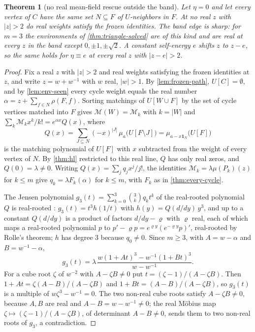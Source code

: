 \documentclass[11pt]{amsart}
\theoremstyle{plain}
\newtheorem{theorem}{Theorem}[section]
\theoremstyle{definition}
\theoremstyle{remark}
\numberwithin{equation}{section}
\newcommand{\Mpot}{\mathcal{M}}           %
\newcommand{\one}{\mathbf{1}}
\begin{document}
\begin{theorem}[no real mean-field rescue outside the band]\label{thm:meanfield}
Let $\eta=0$ and let every vertex of $C$ have the same set $N\subseteq F$ of $U$-neighbors in $F$. At no real $z$ with $|z|>2$ do real weights satisfy the frozen identities. The band edge is sharp: for $m=3$ the environments of \cref{thm:triangle-solved} are of this kind and are real at every $z$ in the band except $0,\pm1,\pm\sqrt2$. A constant self-energy $e$ shifts $z$ to $z-e$, so the same holds for $\eta\equiv e$ at every real $z$ with $|z-e|>2$.
\end{theorem}
\begin{proof}
Fix a real $z$ with $|z|>2$ and real weights satisfying the frozen identities at $z$, and write $z=w+w^{-1}$ with $w$ real, $|w|>1$. By \cref{lem:frozen-path}, $U[C]=\emptyset$, and by \cref{lem:env-seen} every cycle weight equals the real number $\alpha=z+\sum_{f\in N}\rho(F,f)$. Sorting matchings of $U[W\cup F]$ by the set of cycle vertices matched into $F$ gives $\Mpot(W)=\Mpot_k$ with $k=|W|$ and $\sum_k\Mpot_kx^{k}/k!=e^{\alpha x}Q(x)$, where
\[
Q(x)=\sum_{J\subseteq N}(-x)^{|J|}\,\mu_a\bigl(U[F\setminus J]\bigr)=\mu_{a-x\one_N}\bigl(U[F]\bigr)
\]
is the matching polynomial of $U[F]$ with $x$ subtracted from the weight of every vertex of $N$. By \cref{thm:hl} restricted to this real line, $Q$ has only real zeros, and $Q(0)=\lambda\neq0$. Writing $Q(x)=\sum_jq_jx^{j}/j!$, the identities $\Mpot_k=\lambda\mu(P_k)(z)$ for $k\le m$ give $q_k=\lambda F_k(\alpha)$ for $k\le m$, with $F_k$ as in \cref{thm:every-cycle}.

The Jensen polynomial $g_3(t)=\sum_{k=0}^{3}\binom3kq_kt^{k}$ of the real-rooted polynomial $Q$ is real-rooted \cite{PolyaSchur}: $g_3(t)=t^{3}h(1/t)$ with $h(y)=Q(d/dy)\,y^{3}$, and up to a constant $Q(d/dy)$ is a product of factors $d/dy-\varrho$ with $\varrho$ real, each of which maps a real-rooted polynomial $p$ to $p'-\varrho p=e^{\varrho y}(e^{-\varrho y}p)'$, real-rooted by Rolle's theorem; $h$ has degree $3$ because $q_0\neq0$. Since $m\ge3$, with $A=w-\alpha$ and $B=w^{-1}-\alpha$,
\[
g_3(t)=\lambda\,\frac{w(1+At)^{3}-w^{-1}(1+Bt)^{3}}{w-w^{-1}}.
\]
For a cube root $\zeta$ of $w^{-2}$ with $A-\zeta B\neq0$ put $t=(\zeta-1)/(A-\zeta B)$. Then $1+At=\zeta(A-B)/(A-\zeta B)$ and $1+Bt=(A-B)/(A-\zeta B)$, so $g_3(t)$ is a multiple of $w\zeta^{3}-w^{-1}=0$. The two non-real cube roots satisfy $A-\zeta B\neq0$, because $A,B$ are real and $A-B=w-w^{-1}\neq0$; the real M\"obius map $\zeta\mapsto(\zeta-1)/(A-\zeta B)$, of determinant $A-B\neq0$, sends them to two non-real roots of $g_3$, a contradiction.
\end{proof}
\end{document}
